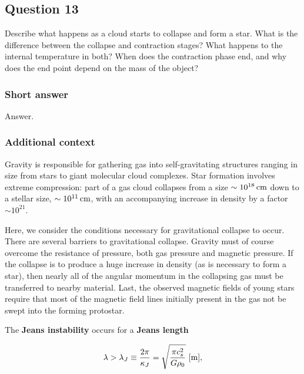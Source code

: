 \documentclass[a4paper,10pt]{article}
\begin{document}

\newpage
\subsection{Question 13}

Describe what happens as a cloud starts to collapse and form a star. What is the difference between the collapse and contraction stages? What happens to the internal temperature in both? When does the contraction phase end, and why does the end point depend on the mass of the object?

\subsubsection{Short answer}

Answer.

\subsubsection{Additional context}

Gravity is responsible for gathering gas into self-gravitating structures ranging in size from stars to giant molecular cloud complexes. Star formation involves extreme compression: part of a gas cloud collapses from a size $\sim10^{18}\,{\rm cm}$ down to a stellar size, $\sim10^{11}\,{\rm cm}$, with an accompanying increase in density by a factor $\sim10^{21}$.

{\noindent}Here, we consider the conditions necessary for gravitational collapse to occur. There are several barriers to gravitational collapse. Gravity must of course overcome the resistance of pressure, both gas pressure and magnetic pressure. If the collapse is to produce a huge increase in density (as is necessary to form a star), then nearly all of the angular momentum in the collapsing gas must be transferred to nearby material. Last, the observed magnetic fields of young stars require that most of the magnetic field lines initially present in the gas not be swept into the forming protostar.

{\noindent}The \textbf{Jeans instability} occurs for a \textbf{Jeans length}

\begin{align*}
    \lambda > \lambda_J \equiv \frac{2\pi}{\kappa_J} = \sqrt{\frac{\pi c_s^2}{G\rho_0}} ~ [{\rm m}],
\end{align*}
\end{document}
